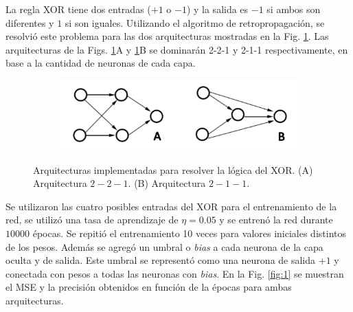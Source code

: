 \documentclass[11pt,twocolumn,twoside]{opticajnl}
\begin{document}
\vspace{0.3cm}

La regla XOR tiene dos entradas ($+1$ o $-1$) y la salida es $-1$ si ambos son diferentes y $1$ si son iguales. Utilizando el algoritmo de retropropagación, se resolvió este problema para las dos arquitecturas mostradas en la Fig. \ref{fig:esq_1}. Las arquitecturas de la Figs. \ref{fig:esq_1}A y \ref{fig:esq_1}B se dominarán 2-2-1 y 2-1-1 respectivamente, en base a la cantidad de neuronas de cada capa. 

\begin{figure}[ht]
    \centering
         \begin{subfigure}[b]{0.75\linewidth}
            \includegraphics[width=\textwidth]{Figuras/esquema1.png}
         \end{subfigure}
    \caption{Arquitecturas implementadas para resolver la lógica del XOR. (A) Arquitectura $2-2-1$. (B) Arquitectura $2-1-1$.} 
    \label{fig:esq_1}
\end{figure}

Se utilizaron las cuatro posibles entradas del XOR para el entrenamiento de la red, se utilizó una tasa de aprendizaje de $\eta = 0.05$ y se entrenó la red durante $10000$ épocas. Se repitió el entrenamiento 10 veces para valores iniciales distintos de los pesos. Además se agregó un umbral o \textit{bias} a cada neurona de la capa oculta y de salida. Este umbral se representó como una neurona de salida $+1$ y conectada con pesos a todas las neuronas con \textit{bias}. En la Fig. \ref{fig:1} se muestran el MSE y la precisión obtenidos en función de la épocas para ambas arquitecturas. 
\end{document}
